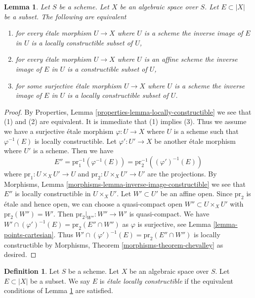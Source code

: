 \documentclass{stacks-project}
\theoremstyle{plain}
\newtheorem{lemma}[subsection]{Lemma}
\theoremstyle{definition}
\newtheorem{definition}[subsection]{Definition}
\theoremstyle{remark}
\numberwithin{equation}{subsection}
\begin{document}
\begin{lemma}
\label{lemma-locally-constructible}
Let $S$ be a scheme. Let $X$ be an algebraic space over $S$.
Let $E \subset |X|$ be a subset. The following are equivalent
\begin{enumerate}
\item for every \'etale morphism $U \to X$ where $U$ is a
scheme the inverse image of $E$ in $U$ is a locally constructible
subset of $U$,
\item for every \'etale morphism $U \to X$ where $U$ is an
affine scheme the inverse image of $E$ in $U$ is a constructible
subset of $U$,
\item for some surjective \'etale morphism $U \to X$ where $U$ is a
scheme the inverse image of $E$ in $U$ is a locally constructible
subset of $U$.
\end{enumerate}
\end{lemma}

\begin{proof}
By Properties, Lemma \ref{properties-lemma-locally-constructible}
we see that (1) and (2) are equivalent. It is immediate that (1)
implies (3). Thus we assume we have a surjective \'etale morphism
$\varphi : U \to X$ where $U$ is a scheme such that $\varphi^{-1}(E)$
is locally constructible. Let $\varphi' : U' \to X$ be another
\'etale morphism where $U'$ is a scheme. Then we have
$$
E'' = \text{pr}_1^{-1}(\varphi^{-1}(E)) = \text{pr}_2^{-1}((\varphi')^{-1}(E))
$$
where $\text{pr}_1 : U \times_X U' \to U$ and
$\text{pr}_2 : U \times_X U' \to U'$ are the projections.
By Morphisms, Lemma \ref{morphisms-lemma-inverse-image-constructible}
we see that $E''$ is locally constructible in $U \times_X U'$.
Let $W' \subset U'$ be an affine open. Since $\text{pr}_2$ is
\'etale and hence open, we can choose a quasi-compact open
$W'' \subset U \times_X U'$ with $\text{pr}_2(W'') = W'$.
Then $\text{pr}_2|_{W''} : W'' \to W'$ is quasi-compact.
We have $W' \cap (\varphi')^{-1}(E) = \text{pr}_2(E'' \cap W'')$
as $\varphi$ is surjective, see Lemma \ref{lemma-points-cartesian}.
Thus $W' \cap (\varphi')^{-1}(E) = \text{pr}_2(E'' \cap W'')$
is locally constructible by
Morphisms, Theorem \ref{morphisms-theorem-chevalley} as desired.
\end{proof}

\begin{definition}
\label{definition-locally-constructible}
Let $S$ be a scheme. Let $X$ be an algebraic space over $S$.
Let $E \subset |X|$ be a subset. We say $E$ is
{\it \'etale locally constructible} if the equivalent
conditions of Lemma \ref{lemma-locally-constructible} are satisfied.
\end{definition}
\end{document}
